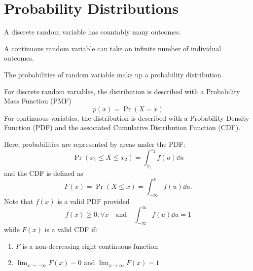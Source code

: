 \documentclass{article}
\begin{document}
\section{Probability Distributions}
\begin{definition}
    A discrete random variable has countably many outcomes.
\end{definition}
\begin{definition}
    A continuous random variable can take an infinite number of individual outcomes.
\end{definition}
\begin{definition}
    The probabilities of random variable make up a probability distribution.

    For discrete random variables, the distribution is described with a Probability
    Mass Function (PMF)
    \begin{equation*}
        p(x) = \Pr{\left( X = x \right)}
    \end{equation*}
    For continuous variables, the distribution is described with a Probability
    Density Function (PDF) and the associated Cumulative Distribution Function (CDF).

    Here, probabilities are represented by areas under the PDF:
    \begin{equation*}
        \Pr{\left( x_1 \leq X \leq x_2 \right)} = \int_{x_1}^{x_2} f(u) \dd{u}
    \end{equation*}
    and the CDF is defined as
    \begin{equation*}
        F(x) = \Pr{\left( X \leq x \right)} = \int_{-\infty}^{x} f(u) \dd{u}.
    \end{equation*}
    Note that $f(x)$ is a valid PDF provided
    \begin{equation*}
        f(x) \geq 0:\forall x \quad \text{and} \quad \int_{-\infty}^{\infty} f(u) \dd{u} = 1
    \end{equation*}
    while $F(x)$ is a valid CDF if:
    \begin{enumerate}
        \item $F$ is a non-decreasing right continuous function
        \item $\lim_{x\to-\infty} F(x) = 0$ and $\lim_{x\to\infty} F(x) = 1$
    \end{enumerate}
\end{definition}
\end{document}
